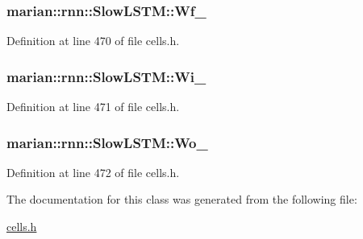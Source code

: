 \subsubsection[{\texorpdfstring{Wf\+\_\+}{Wf_}}]{ marian\+::rnn\+::\+Slow\+L\+S\+T\+M\+::\+Wf\+\_\+\hspace{0.3cm}{\ttfamily [private]}}\hypertarget{classmarian_1_1rnn_1_1SlowLSTM_ab8dd236b36be5cdd108e75b9116da34e}{}\label{classmarian_1_1rnn_1_1SlowLSTM_ab8dd236b36be5cdd108e75b9116da34e}


Definition at line 470 of file cells.\+h.

\subsubsection[{\texorpdfstring{Wi\+\_\+}{Wi_}}]{ marian\+::rnn\+::\+Slow\+L\+S\+T\+M\+::\+Wi\+\_\+\hspace{0.3cm}{\ttfamily [private]}}\hypertarget{classmarian_1_1rnn_1_1SlowLSTM_a9cd05b7615b49553add0e718d3d05e8f}{}\label{classmarian_1_1rnn_1_1SlowLSTM_a9cd05b7615b49553add0e718d3d05e8f}


Definition at line 471 of file cells.\+h.

\subsubsection[{\texorpdfstring{Wo\+\_\+}{Wo_}}]{ marian\+::rnn\+::\+Slow\+L\+S\+T\+M\+::\+Wo\+\_\+\hspace{0.3cm}{\ttfamily [private]}}\hypertarget{classmarian_1_1rnn_1_1SlowLSTM_ac6a0bf627927c7fb78f5042b312b573e}{}\label{classmarian_1_1rnn_1_1SlowLSTM_ac6a0bf627927c7fb78f5042b312b573e}


Definition at line 472 of file cells.\+h.



The documentation for this class was generated from the following file\+:\begin{DoxyCompactItemize}
\item 
\hyperlink{cells_8h}{cells.\+h}\end{DoxyCompactItemize}
